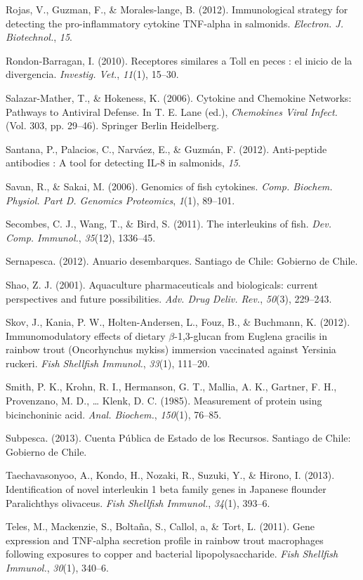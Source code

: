 \documentclass[12pt,a4paper,]{article}
\begin{document}
Rojas, V., Guzman, F., \& Morales-lange, B. (2012). Immunological
strategy for detecting the pro-inflammatory cytokine TNF-alpha in
salmonids. \emph{Electron. J. Biotechnol.}, \emph{15}.

Rondon-Barragan, I. (2010). Receptores similares a Toll en peces : el
inicio de la divergencia. \emph{Investig. Vet.}, \emph{11}(1), 15--30.

Salazar-Mather, T., \& Hokeness, K. (2006). Cytokine and Chemokine
Networks: Pathways to Antiviral Defense. In T. E. Lane (ed.),
\emph{Chemokines Viral Infect.} (Vol. 303, pp. 29--46). Springer Berlin
Heidelberg.

Santana, P., Palacios, C., Narváez, E., \& Guzmán, F. (2012).
Anti-peptide antibodies : A tool for detecting IL-8 in salmonids,
\emph{15}.

Savan, R., \& Sakai, M. (2006). Genomics of fish cytokines. \emph{Comp.
Biochem. Physiol. Part D. Genomics Proteomics}, \emph{1}(1), 89--101.

Secombes, C. J., Wang, T., \& Bird, S. (2011). The interleukins of fish.
\emph{Dev. Comp. Immunol.}, \emph{35}(12), 1336--45.

Sernapesca. (2012). Anuario desembarques. Santiago de Chile: Gobierno de
Chile.

Shao, Z. J. (2001). Aquaculture pharmaceuticals and biologicals: current
perspectives and future possibilities. \emph{Adv. Drug Deliv. Rev.},
\emph{50}(3), 229--243.

Skov, J., Kania, P. W., Holten-Andersen, L., Fouz, B., \& Buchmann, K.
(2012). Immunomodulatory effects of dietary $\beta$-1,3-glucan from
Euglena gracilis in rainbow trout (Oncorhynchus mykiss) immersion
vaccinated against Yersinia ruckeri. \emph{Fish Shellfish Immunol.},
\emph{33}(1), 111--20.

Smith, P. K., Krohn, R. I., Hermanson, G. T., Mallia, A. K., Gartner, F.
H., Provenzano, M. D., \ldots{} Klenk, D. C. (1985). Measurement of
protein using bicinchoninic acid. \emph{Anal. Biochem.}, \emph{150}(1),
76--85.

Subpesca. (2013). Cuenta Pública de Estado de los Recursos. Santiago de
Chile: Gobierno de Chile.

Taechavasonyoo, A., Kondo, H., Nozaki, R., Suzuki, Y., \& Hirono, I.
(2013). Identification of novel interleukin 1 beta family genes in
Japanese flounder Paralichthys olivaceus. \emph{Fish Shellfish
Immunol.}, \emph{34}(1), 393--6.

Teles, M., Mackenzie, S., Boltaña, S., Callol, a, \& Tort, L. (2011).
Gene expression and TNF-alpha secretion profile in rainbow trout
macrophages following exposures to copper and bacterial
lipopolysaccharide. \emph{Fish Shellfish Immunol.}, \emph{30}(1),
340--6.
\end{document}

